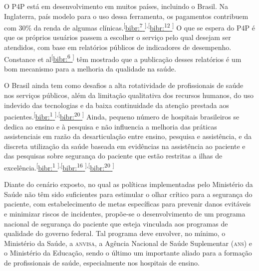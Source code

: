 \documentclass{article}
\begin{document}
O P4P está em desenvolvimento em muitos países, incluindo o Brasil. Na
Inglaterra, país
modelo para o uso dessa ferramenta, os pagamentos contribuem com 30\% da renda
de algumas
clínicas.\textsuperscript{[}\hyperlink{\textsuperscript{7}
}{bibr:\textsuperscript{7}
}\textsuperscript{]}\textsuperscript{,}\textsuperscript{[}\hyperlink{\textsuperscript{12}
}{bibr:\textsuperscript{12}
}\textsuperscript{]}
O que se espera do P4P é que os próprios usuários passem a escolher o serviço
pelo
qual desejam ser atendidos, com base em relatórios públicos de indicadores de
desempenho.
Constance et al\textsuperscript{[}\hyperlink{\textsuperscript{6}
}{bibr:\textsuperscript{6}
}\textsuperscript{]}
têm mostrado que a publicação desses relatórios é um bom mecanismo para a
melhoria
da qualidade na saúde.

O Brasil ainda tem como desafios a alta rotatividade de profissionais de saúde
nos serviços
públicos, além da limitação qualitativa dos recursos humanos, do uso indevido
das
tecnologias e da baixa continuidade da atenção prestada aos pacientes.\textsuperscript{[}\hyperlink{\textsuperscript{1}
}{bibr:\textsuperscript{1}
}\textsuperscript{]}\textsuperscript{,}\textsuperscript{[}\hyperlink{\textsuperscript{20}
}{bibr:\textsuperscript{20}
}\textsuperscript{]}
Ainda, pequeno número de hospitais brasileiros se dedica ao ensino e à pesquisa
e
não influencia a melhoria das práticas assistenciais em razão da desarticulação
entre
ensino, pesquisa e assistência, e da discreta utilização da saúde baseada em
evidências na
assistência ao paciente e das pesquisas sobre segurança do paciente que estão
restritas a
ilhas de excelência.\textsuperscript{[}\hyperlink{\textsuperscript{1}
}{bibr:\textsuperscript{1}
}\textsuperscript{]}\textsuperscript{,}\textsuperscript{[}\hyperlink{\textsuperscript{16}
}{bibr:\textsuperscript{16}
}\textsuperscript{]}\textsuperscript{,}\textsuperscript{[}\hyperlink{\textsuperscript{20}
}{bibr:\textsuperscript{20}
}\textsuperscript{]}

Diante do cenário exposto, no qual as políticas implementadas pelo Ministério da
Saúde não
têm sido suficientes para estimular o olhar crítico para a segurança do
paciente, com
estabelecimento de metas específicas para prevenir danos evitáveis e minimizar
riscos de
incidentes, propõe-se o desenvolvimento de um programa nacional de segurança do
paciente que
esteja vinculada aos programas de qualidade do governo federal. Tal programa
deve envolver,
no mínimo, o Ministério da Saúde, a \textsc{anvisa}, a Agência Nacional de Saúde
Suplementar (\textsc{ans}) e
o Ministério da Educação, sendo o último um importante aliado para a formação de
profissionais de saúde, especialmente nos hospitais de ensino.
\end{document}

